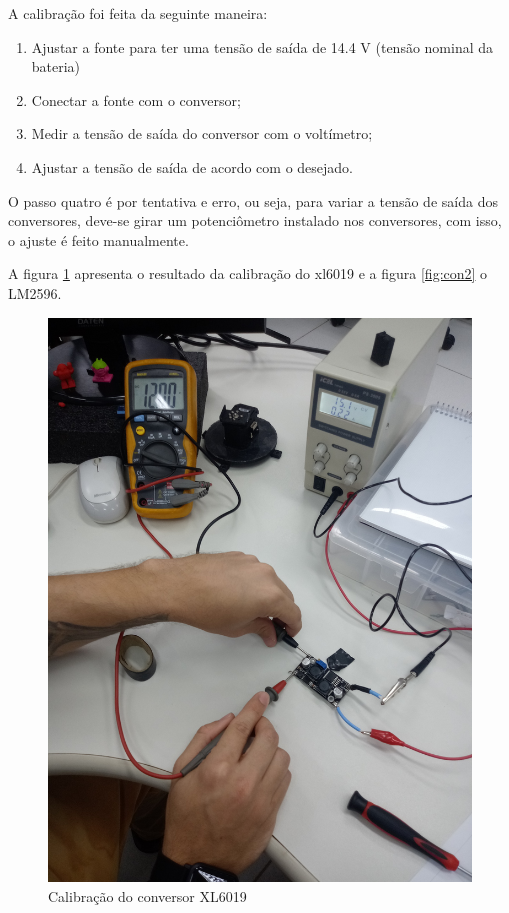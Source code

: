 A calibração foi feita da seguinte maneira:
\begin{enumerate}
	\item Ajustar a fonte para ter uma tensão de saída de 14.4 V (tensão nominal da bateria)
	\item Conectar a fonte com o conversor;
	\item Medir a tensão de saída do conversor com o voltímetro;
	\item Ajustar a tensão de saída de acordo com o desejado.
\end{enumerate}

O passo quatro é por tentativa e erro, ou seja, para variar a tensão de saída dos conversores, deve-se girar um potenciômetro instalado nos conversores, com isso, o ajuste é feito manualmente.

A figura \ref{fig:con1} apresenta o resultado da calibração do xl6019 e a figura \ref{fig:con2} o LM2596.

    \begin{figure}[H]
    	\centering
    	\includegraphics[scale=0.4, angle=0]{Figures/conversor1.jpg}
    	\caption{Calibração do conversor XL6019}
    	\label{fig:con1}
    \end{figure}
    
